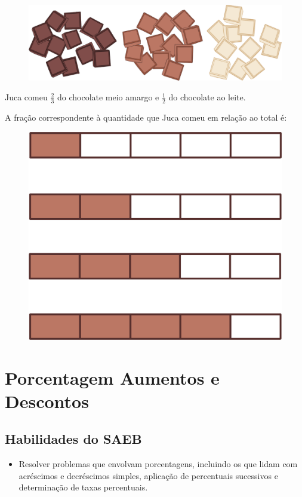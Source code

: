\begin{figure}[htpb!]
\centering
\includegraphics[width=.5\textwidth]{./ilustras-mat/modulo_3-treino_3.png}
\end{figure}


Juca comeu $\frac{2}{3}$ do chocolate meio amargo e $\frac{1}{2}$ do
chocolate ao leite.

A fração correspondente à quantidade que Juca comeu em relação ao total é:

\begin{figure}[htpb!]
\includegraphics[width=.5\textwidth]{./ilustras-mat/modulo_3-treino_3_opcoes.png}
\end{figure}

\chapter{Porcentagem Aumentos e Descontos}

\section*{Habilidades do SAEB}

\begin{itemize}
  \item Resolver problemas que envolvam porcentagens, incluindo os que 
  lidam com acréscimos e decréscimos simples, aplicação de percentuais
  sucessivos e determinação de taxas percentuais.   
\end{itemize} 

